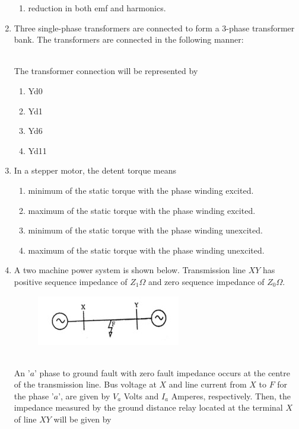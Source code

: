 \documentclass[journal]{IEEEtran}
\begin{document}
\begin{enumerate}
\begin{enumerate}
    \item reduction in both emf and harmonics. \\
\end{enumerate}
\item Three single-phase transformers are connected to form a 3-phase transformer bank. The transformers are connected in the following manner:\\
\begin{figure}[!ht]
\centering
\resizebox{0.5\textwidth}{!}{%

}%
\end{figure}\\
The transformer connection will be represented by
\begin{enumerate}
    \item Yd0
    \item Yd1
    \item Yd6
    \item Yd11 \\
\end{enumerate}
\item In a stepper motor, the detent torque means
\begin{enumerate}
    \item minimum of the static torque with the phase winding excited.
    \item maximum of the static torque with the phase winding excited.
    \item minimum of the static torque with the phase winding unexcited.
    \item maximum of the static torque with the phase winding unexcited. \\
\end{enumerate}
\item A two machine power system is shown below. Transmission line $XY$ has positive sequence impedance of $Z_1 \Omega$ and zero sequence impedance of $Z_0 \Omega$. \\
\begin{figure}[h!]
\centering
   \includegraphics[width=0.5\linewidth]{figs/Q14.png}
   \end{figure}\\
An '$a$' phase to ground fault with zero fault impedance occurs at the centre of the transmission line. Bus voltage at $X$ and line current from $X$ to $F$ for the phase '$a$', are given by $V_a$ Volts and $I_a$ Amperes, respectively. Then, the impedance measured by the ground distance relay located at the terminal $X$ of line $XY$ will be given by

\end{enumerate}
\end{document}
